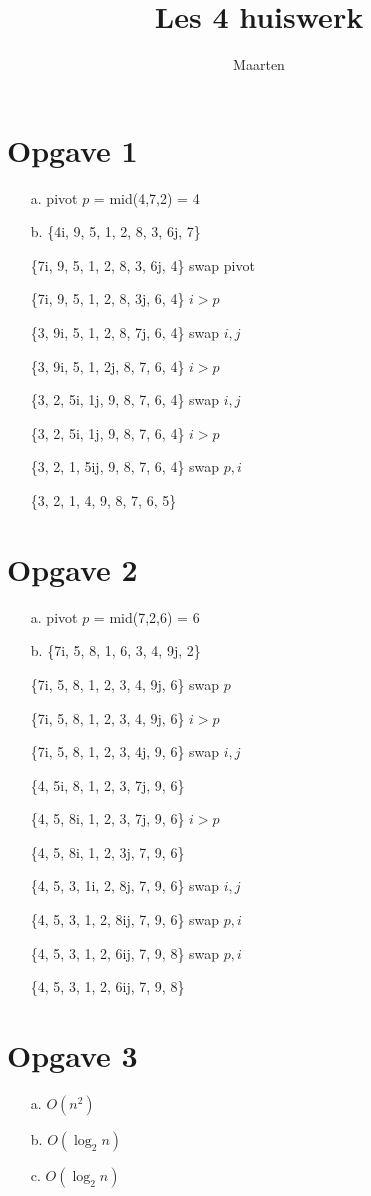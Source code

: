 \documentclass[12pt,a4paper]{article}
\title{Les 4 huiswerk}
\author{Maarten}
\begin{document}
\maketitle

\section{Opgave 1}
\begin{itemize}
\item[a.] pivot $p$ = mid(4,7,2) = 4
\item[b.] \{4i, 9, 5, 1, 2, 8, 3, 6j, 7\}
\item[] \{7i, 9, 5, 1, 2, 8, 3, 6j, 4\} swap pivot
\item[] \{7i, 9, 5, 1, 2, 8, 3j, 6, 4\} $i>p$
\item[] \{3, 9i, 5, 1, 2, 8, 7j, 6, 4\} swap $i,j$
\item[] \{3, 9i, 5, 1, 2j, 8, 7, 6, 4\} $i>p$
\item[] \{3, 2, 5i, 1j, 9, 8, 7, 6, 4\} swap $i,j$
\item[] \{3, 2, 5i, 1j, 9, 8, 7, 6, 4\} $i>p$
\item[] \{3, 2, 1, 5ij, 9, 8, 7, 6, 4\} swap $p,i$
\item[] \{3, 2, 1, 4, 9, 8, 7, 6, 5\}
\end{itemize}

\section{Opgave 2}
\begin{itemize}
\item[a.] pivot $p$ = mid(7,2,6) = 6
\item[b.] \{7i, 5, 8, 1, 6, 3, 4, 9j, 2\}
\item[] \{7i, 5, 8, 1, 2, 3, 4, 9j, 6\} swap $p$
\item[] \{7i, 5, 8, 1, 2, 3, 4, 9j, 6\} $i>p$
\item[] \{7i, 5, 8, 1, 2, 3, 4j, 9, 6\} swap $i,j$
\item[] \{4, 5i, 8, 1, 2, 3, 7j, 9, 6\}
\item[] \{4, 5, 8i, 1, 2, 3, 7j, 9, 6\} $i>p$
\item[] \{4, 5, 8i, 1, 2, 3j, 7, 9, 6\}
\item[] \{4, 5, 3, 1i, 2, 8j, 7, 9, 6\} swap $i,j$
\item[] \{4, 5, 3, 1, 2, 8ij, 7, 9, 6\} swap $p,i$
\item[] \{4, 5, 3, 1, 2, 6ij, 7, 9, 8\} swap $p,i$
\item[] \{4, 5, 3, 1, 2, 6ij, 7, 9, 8\}
\end{itemize}

\section{Opgave 3}
\begin{itemize}
\item[a.] $O(n^2)$
\item[b.] $O(\log_2 n)$
\item[c.] $O(\log_2 n)$
\end{itemize}
\end{document}
